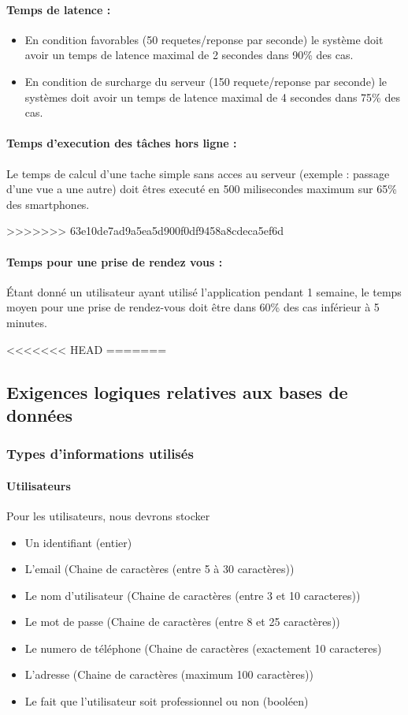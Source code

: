 \documentclass{article}
\begin{document}
\begin{itemize}
\paragraph{Temps de latence :}
\begin{itemize}
\item En condition favorables (50 requetes/reponse par seconde) le
  système doit avoir un temps de latence maximal de 2 secondes dans
  90\% des cas.
\item En condition de surcharge du serveur (150 requete/reponse par
  seconde) le systèmes doit avoir un temps de latence maximal de 4
  secondes dans 75\% des cas.
\end{itemize}

\paragraph{Temps d'execution des tâches hors ligne :}
Le temps de calcul d'une tache simple sans acces au serveur (exemple : passage d'une vue a
une autre) doit êtres executé en 500 milisecondes maximum sur 65\% des
smartphones.

>>>>>>> 63e10de7ad9a5ea5d900f0df9458a8cdeca5ef6d
\paragraph{Temps pour une prise de rendez vous :}
Étant donné un utilisateur ayant utilisé l'application pendant 1
semaine, le temps moyen pour une prise de rendez-vous doit être dans
60\% des cas inférieur à 5 minutes.

<<<<<<< HEAD
=======
\subsection{Exigences logiques relatives aux bases de données}
\subsubsection{Types d'informations utilisés}
\paragraph{Utilisateurs}
Pour les utilisateurs, nous devrons stocker
\begin{itemize}
\item Un identifiant (entier)
\item L'email (Chaine de caractères (entre 5 à 30 caractères))
\item Le nom d'utilisateur (Chaine de caractères (entre 3 et 10 caracteres))
\item Le mot de passe (Chaine de caractères (entre 8 et 25 caractères))
\item Le numero de téléphone (Chaine de caractères (exactement 10 caracteres)
\item L'adresse (Chaine de caractères (maximum 100 caractères))
\item Le fait que l'utilisateur soit professionnel ou non (booléen)
\end{itemize}


\end{itemize}
\end{document}
